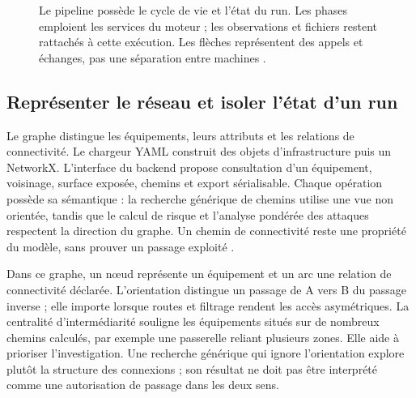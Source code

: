 \documentclass[11pt,a4paper]{article}
\DeclareRobustCommand{\code}[1]{{\small\path{#1}}}
\begin{document}
\begin{figure}[htbp]
\centering
{}
\caption{Le pipeline possède le cycle de vie et l'état du run. Les phases
emploient les services du moteur ; les observations et fichiers restent
rattachés à cette exécution. Les flèches représentent des appels et échanges,
pas une séparation entre machines \cite{arch-contexte,arch-executeur}.}
\label{fig:arch-moteur}
\end{figure}

\subsection{Représenter le réseau et isoler l'état d'un run}
Le graphe distingue les équipements, leurs attributs et les relations de
connectivité. Le chargeur YAML construit des objets d'infrastructure puis un
\code{DiGraph} NetworkX. L'interface du backend propose consultation d'un
équipement, voisinage, surface exposée, chemins et export sérialisable.
Chaque opération possède sa sémantique : la recherche générique de chemins
utilise une vue non orientée, tandis que le calcul de risque et l'analyse
pondérée des attaques respectent la direction du graphe. Un chemin de
connectivité reste une propriété du modèle, sans prouver un passage exploité
\cite{arch-chargeur,arch-graphe,arch-risque,arch-chemins}.

Dans ce graphe, un nœud représente un équipement et un arc une relation de
connectivité déclarée. L'orientation distingue un passage de A vers B du passage
inverse ; elle importe lorsque routes et filtrage rendent les accès
asymétriques. La centralité d'intermédiarité souligne les équipements situés
sur de nombreux chemins calculés, par exemple une passerelle reliant plusieurs
zones. Elle aide à prioriser l'investigation. Une recherche générique qui ignore
l'orientation explore plutôt la structure des connexions ; son résultat ne
doit pas être interprété comme une autorisation de passage dans les deux sens.
\end{document}
